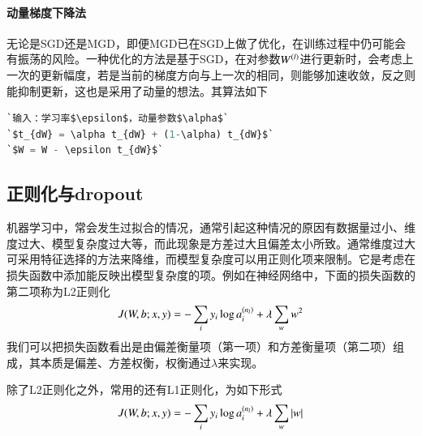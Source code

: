 \paragraph{动量梯度下降法}
无论是SGD还是MGD，即便MGD已在SGD上做了优化，在训练过程中仍可能会有振荡的风险。一种优化的方法是基于SGD，在对参数$\sample{W}{l}$进行更新时，会考虑上一次的更新幅度，若是当前的梯度方向与上一次的相同，则能够加速收敛，反之则能抑制更新，这也是采用了动量的想法。其算法如下
\begin{lstlisting}[language=python]
`输入：学习率$\epsilon$，动量参数$\alpha$`
`$t_{dW} = \alpha t_{dW} + (1-\alpha) t_{dW}$`
`$W = W - \epsilon t_{dW}$`
\end{lstlisting}
\subsection{正则化与dropout}
机器学习中，常会发生过拟合的情况，通常引起这种情况的原因有数据量过小、维度过大、模型复杂度过大等，而此现象是方差过大且偏差太小所致。通常维度过大可采用特征选择的方法来降维，而模型复杂度可以用正则化项来限制。它是考虑在损失函数中添加能反映出模型复杂度的项。例如在神经网络中，下面的损失函数的第二项称为L2正则化
\begin{eqnarray}
J(W,b;x,y) = -\sum_i y_i \log \samplet{a}{n_l}{i} + \lambda\sum_w w^2
\end{eqnarray}
我们可以把损失函数看出是由偏差衡量项（第一项）和方差衡量项（第二项）组成，其本质是偏差、方差权衡，权衡通过$\lambda$来实现。

除了L2正则化之外，常用的还有L1正则化，为如下形式
\begin{eqnarray}
J(W,b;x,y) = -\sum_i y_i \log \samplet{a}{n_l}{i} + \lambda\sum_w |w|
\end{eqnarray}

